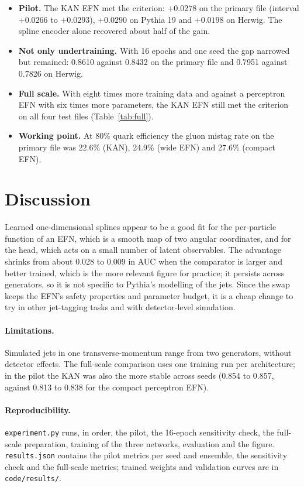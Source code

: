 \documentclass[11pt]{article}
\begin{document}
\begin{itemize}
\item \textbf{Pilot.} The KAN EFN met the criterion: $+0.0278$ on the primary file (interval $+0.0266$ to
$+0.0293$), $+0.0290$ on Pythia 19 and $+0.0198$ on Herwig. The spline encoder alone recovered about half of the gain.
\item \textbf{Not only undertraining.} With 16 epochs and one seed the gap narrowed but remained: 0.8610 against 0.8432
on the primary file and 0.7951 against 0.7826 on Herwig.
\item \textbf{Full scale.} With eight times more training data and against a perceptron EFN with six times more
parameters, the KAN EFN still met the criterion on all four test files (Table~\ref{tab:full}).
\item \textbf{Working point.} At 80\% quark efficiency the gluon mistag rate on the primary file was 22.6\% (KAN),
24.9\% (wide EFN) and 27.6\% (compact EFN).
\end{itemize}

\section{Discussion}
Learned one-dimensional splines appear to be a good fit for the per-particle function of an EFN, which is a smooth
map of two angular coordinates, and for the head, which acts on a small number of latent observables. The advantage
shrinks from about 0.028 to 0.009 in AUC when the comparator is larger and better trained, which is the more relevant
figure for practice; it persists across generators, so it is not specific to Pythia's modelling of the jets. Since
the swap keeps the EFN's safety properties and parameter budget, it is a cheap change to try in other jet-tagging
tasks and with detector-level simulation.

\paragraph{Limitations.} Simulated jets in one transverse-momentum range from two generators, without detector
effects. The full-scale comparison uses one training run per architecture; in the pilot the KAN was also the more
stable across seeds (0.854 to 0.857, against 0.813 to 0.838 for the compact perceptron EFN).

\paragraph{Reproducibility.} \texttt{experiment.py} runs, in order, the pilot, the 16-epoch sensitivity check, the
full-scale preparation, training of the three networks, evaluation and the figure. \texttt{results.json}
contains the pilot metrics per seed and ensemble, the sensitivity check and the full-scale metrics; trained weights and
validation curves are in \texttt{code/results/}.
\end{document}
